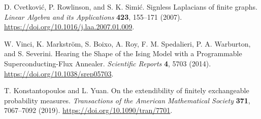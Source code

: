 D. Cvetkovi\'c, P. Rowlinson, and S. K. Simi\'c.
Signless Laplacians of finite graphs.
\emph{Linear Algebra and its Applications} \textbf{423}, 155--171 (2007).
\url{https://doi.org/10.1016/j.laa.2007.01.009}.

W. Vinci, K. Markstr\"om, S. Boixo, A. Roy, F. M. Spedalieri,
P. A. Warburton, and S. Severini.
Hearing the Shape of the Ising Model with a Programmable
Superconducting-Flux Annealer.
\emph{Scientific Reports} \textbf{4}, 5703 (2014).
\url{https://doi.org/10.1038/srep05703}.

T. Konstantopoulos and L. Yuan.
On the extendibility of finitely exchangeable probability measures.
\emph{Transactions of the American Mathematical Society}
\textbf{371}, 7067--7092 (2019).
\url{https://doi.org/10.1090/tran/7701}.
